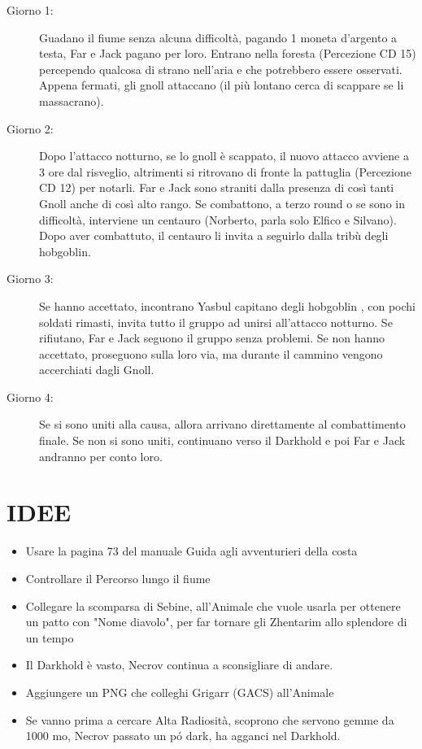 \documentclass{article}
\begin{document}
\begin{description}
    \item[Giorno 1:] Guadano il fiume senza alcuna difficoltà, pagando 1 moneta d'argento a testa, Far e Jack pagano per loro. Entrano nella foresta (Percezione CD 15) percependo qualcosa di strano nell'aria e che potrebbero essere osservati. Appena fermati, gli gnoll attaccano (il più lontano cerca di scappare se li massacrano).
    
    \item[Giorno 2:] Dopo l'attacco notturno, se lo gnoll è scappato, il nuovo attacco avviene a 3 ore dal risveglio, altrimenti si ritrovano di fronte la pattuglia (Percezione CD 12) per notarli. Far e Jack sono straniti dalla presenza di così tanti Gnoll anche di così alto rango. Se combattono, a terzo round o se sono in difficoltà, interviene un centauro (Norberto, parla solo Elfico e Silvano). Dopo aver combattuto, il centauro li invita a seguirlo dalla tribù degli hobgoblin.
    
    \item[Giorno 3:] Se hanno accettato, incontrano Yasbul capitano degli hobgoblin , con pochi soldati rimasti, invita tutto il gruppo ad unirsi all'attacco notturno. Se rifiutano, Far e Jack seguono il gruppo senza problemi. Se non hanno accettato, proseguono sulla loro via, ma durante il cammino vengono accerchiati dagli Gnoll.
    
    \item[Giorno 4:] Se si sono uniti alla causa, allora arrivano direttamente al combattimento finale. Se non si sono uniti, continuano verso il Darkhold e poi Far e Jack andranno per conto loro.
\end{description}

        \section{IDEE}
            \begin{itemize}
                \item Usare la pagina 73 del manuale Guida agli avventurieri della costa
                \item Controllare il Percorso lungo il fiume
                \item Collegare la scomparsa di Sebine,  all'Animale che vuole usarla per ottenere un patto con "Nome diavolo", per far tornare  gli Zhentarim allo splendore di un tempo
                \item Il Darkhold è vasto, Necrov continua a sconsigliare di andare.
                \item Aggiungere un PNG che colleghi Grigarr (GACS) all'Animale
                \item Se vanno prima a cercare Alta Radiosità, scoprono che servono gemme da 1000 mo, Necrov passato un pó dark, ha agganci nel Darkhold.  
            \end{itemize}
\end{document}
